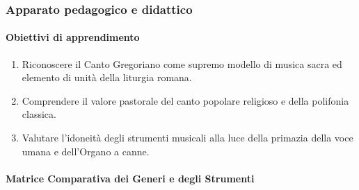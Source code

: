 \documentclass[12pt,a4paper]{article}
\begin{document}
	\subsubsection{Apparato pedagogico e didattico}\label{apparato-pedagogico-e-didattico-8}
	
	\paragraph{Obiettivi di apprendimento}\label{obiettivi-di-apprendimento-8}
	
	\begin{enumerate}[label=\arabic*.,leftmargin=*]
		\item Riconoscere il Canto Gregoriano come supremo modello di musica sacra ed elemento di unità della liturgia romana.
		\item Comprendere il valore pastorale del canto popolare religioso e della polifonia classica.
		\item Valutare l'idoneità degli strumenti musicali alla luce della primazia della voce umana e dell'Organo a canne.
	\end{enumerate}
	
	\paragraph{Matrice Comparativa dei Generi e degli Strumenti}\label{matrice-comparativa-dei-generi-e-degli-strumenti}
	
\end{document}
